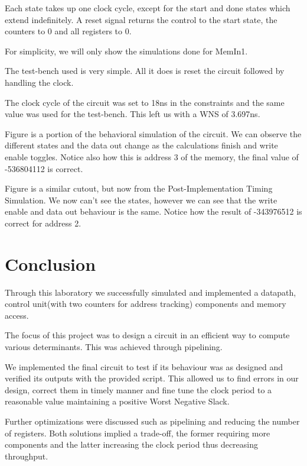 \documentclass[12pt]{article}
\begin{document}
Each state takes up one clock cycle, except for the start and done states which extend indefinitely. A reset signal returns the control to the start state, the counters to 0 and all registers to 0.


For simplicity, we will only show the simulations done for MemIn1.

The test-bench used is very simple. All it does is reset the circuit followed by handling the clock.

The clock cycle of the circuit was set to 18ns in the constraints and the same value was used for the test-bench. This left us with a WNS of 3.697ns.


Figure is a portion of the behavioral simulation of the circuit. We can observe the different states and the data out change as the calculations finish and write enable toggles. Notice also how this is address 3 of the memory, the final value of -536804112 is correct.


Figure is a similar cutout, but now from the Post-Implementation Timing Simulation. We now can't see the states, however we can see that the write enable and data out behaviour is the same. Notice how the result of -343976512 is correct for address 2.


\section{Conclusion}
Through this laboratory we successfully simulated and implemented a datapath, control unit(with two counters for address tracking) components and memory access.

The focus of this project was to design a circuit in an efficient way to compute various determinants. This was achieved through pipelining.
  
We implemented the final circuit to test if its behaviour was as designed and verified its outputs with the provided script. This allowed us to
find errors in our design, correct them in timely manner and fine tune the clock period to a reasonable value maintaining a positive Worst Negative Slack.

Further optimizations were discussed such as pipelining and reducing the number of registers. Both solutions implied a trade-off, the former requiring more components and the latter increasing the clock period thus decreasing throughput.

\printbibliography
\end{document}

